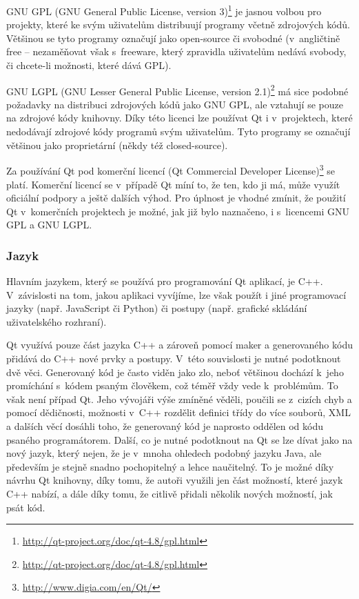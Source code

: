 \documentclass[a4paper,12pt]{article}
\begin{document}
GNU GPL (GNU General Public License, version 3)\footnote{\url{http://qt-project.org/doc/qt-4.8/gpl.html}} je jasnou volbou pro projekty, které ke svým uživatelům distribuují programy včetně zdrojových kódů.
Většinou se tyto programy označují jako open-source či svobodné (v~angličtině free -- nezaměňovat však s~freeware, který zpravidla uživatelům nedává svobody, či chcete-li možnosti, které dává GPL).

GNU LGPL (GNU Lesser General Public License, version 2.1)\footnote{\url{http://qt-project.org/doc/qt-4.8/gpl.html}} má sice podobné požadavky na distribuci zdrojových kódů jako GNU GPL, ale vztahují se pouze na zdrojové kódy knihovny.
Díky této licenci lze používat Qt i v~projektech, které nedodávají zdrojové kódy programů svým uživatelům.
Tyto programy se označují většinou jako proprietární (někdy též closed-source).

Za používání Qt pod komerční licencí (Qt Commercial Developer License)\footnote{\url{http://www.digia.com/en/Qt/}} se platí.
Komerční licencí se v~případě Qt míní to, že ten, kdo ji má, může využít oficiální podpory a ještě dalších výhod.
Pro úplnost je vhodné zmínit, že použití Qt v~komerčních projektech je možné, jak již bylo naznačeno, i s~licencemi GNU GPL a GNU LGPL.


\subsubsection{Jazyk}
Hlavním jazykem, který se používá pro programování Qt aplikací, je C++.
V~závislosti na tom, jakou aplikaci vyvíjíme, lze však použít i jiné programovací jazyky (např. JavaScript či Python) či postupy (např. grafické skládání uživatelského rozhraní).

Qt využívá pouze část jazyka C++ a zároveň pomocí maker a generovaného kódu přidává do C++ nové prvky a postupy.
V~této souvislosti je nutné podotknout dvě věci.
Generovaný kód je často viděn jako zlo, neboť většinou dochází k~jeho promíchání s~kódem psaným člověkem, což téměř vždy vede k~problémům.
To však není případ Qt.
Jeho vývojáři výše zmíněné věděli, poučili se z~cizích chyb a pomocí dědičnosti, možnosti v~C++ rozdělit definici třídy do více souborů, XML a dalších věcí dosáhli toho, že generovaný kód je naprosto oddělen od kódu psaného programátorem.
Další, co je nutné podotknout na Qt se lze dívat jako na nový jazyk, který nejen, že je v~mnoha ohledech podobný jazyku Java, ale především je stejně snadno pochopitelný a lehce naučitelný.
To je možné díky návrhu Qt knihovny, díky tomu, že autoři využili jen část možností, které jazyk C++ nabízí, a dále díky tomu, že citlivě přidali několik nových možností, jak psát kód.
\end{document}
